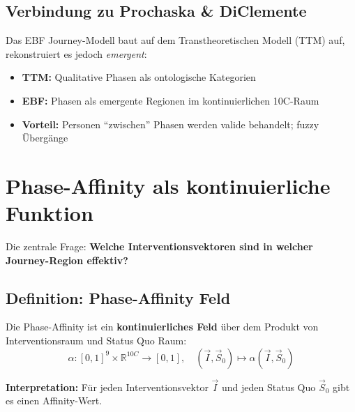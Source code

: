 \subsection{Verbindung zu Prochaska \& DiClemente}

Das EBF Journey-Modell baut auf dem Transtheoretischen Modell (TTM) auf, rekonstruiert es jedoch \textit{emergent}:

\begin{itemize}
\item \textbf{TTM:} Qualitative Phasen als ontologische Kategorien
\item \textbf{EBF:} Phasen als emergente Regionen im kontinuierlichen 10C-Raum
\item \textbf{Vorteil:} Personen ``zwischen'' Phasen werden valide behandelt; fuzzy Übergänge
\end{itemize}


\section{Phase-Affinity als kontinuierliche Funktion}
\label{sec:18-affinity}

Die zentrale Frage: \textbf{Welche Interventionsvektoren sind in welcher Journey-Region effektiv?}

\subsection{Definition: Phase-Affinity Feld}

\begin{tcolorbox}[colback=blue!5!white, colframe=blue!75!black,
    title=\textbf{Definition: Phase-Affinity als kontinuierliches Feld}]

Die Phase-Affinity ist ein \textbf{kontinuierliches Feld} über dem Produkt von Interventionsraum und Status Quo Raum:
\begin{equation}
\boxed{\alpha: [0,1]^9 \times \mathbb{R}^{10C} \rightarrow [0,1], \quad (\vec{I}, \vec{S}_0) \mapsto \alpha(\vec{I}, \vec{S}_0)}
\end{equation}

\textbf{Interpretation:} Für jeden Interventionsvektor $\vec{I}$ und jeden Status Quo $\vec{S}_0$ gibt es einen Affinity-Wert.

\end{tcolorbox}

